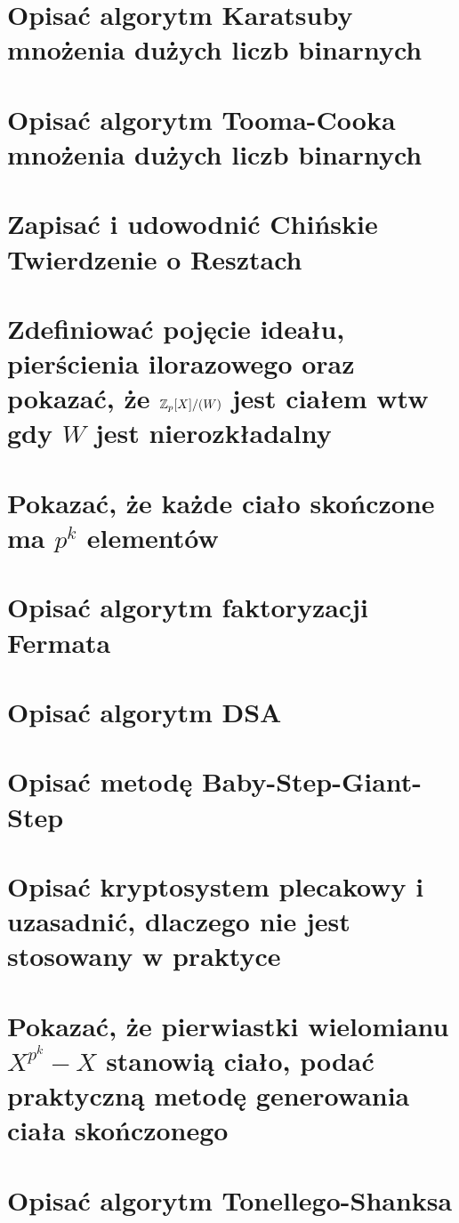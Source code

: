 \section{Opisać algorytm Karatsuby mnożenia dużych liczb binarnych}


\section{Opisać algorytm Tooma-Cooka mnożenia dużych liczb binarnych}


\section{Zapisać i udowodnić Chińskie Twierdzenie o Resztach}


\section{Zdefiniować pojęcie ideału, pierścienia ilorazowego oraz pokazać, że \( \mathbb{Z}_p[X]/(W) \) jest ciałem wtw gdy \( W \) jest nierozkładalny} 

\section{Pokazać, że każde ciało skończone ma \( p^k \) elementów}


\section{Opisać algorytm faktoryzacji Fermata}


\section{Opisać algorytm DSA}


\section{Opisać metodę Baby-Step-Giant-Step}


\section{Opisać kryptosystem plecakowy i uzasadnić, dlaczego nie jest stosowany w praktyce}


\section{Pokazać, że pierwiastki wielomianu \( X^{p^k} - X \) stanowią ciało, podać praktyczną metodę generowania ciała skończonego}



\section{Opisać algorytm Tonellego-Shanksa}
